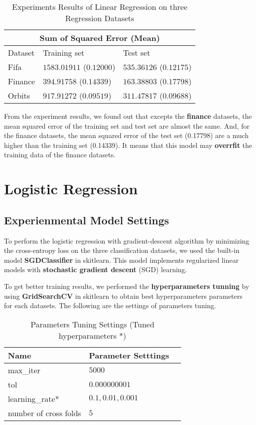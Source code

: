 \documentclass{article}
\begin{document}
\begin{table}[htb]
	\caption{Experiments Results of Linear Regression on three Regression Datasets}
	\label{sample-table}
	\centering
	\begin{tabular}{lll}
		\toprule
		\cmidrule{1-3}
		\multicolumn{3}{c}{Sum of Squared Error (Mean)}\\
		\midrule
		Dataset & Training set & Test set \\
		\midrule
		Fifa & $1583.01911$ ($0.12000$) & $535.36126$ ($0.12175$) \\
		Finance & $394.91758$ ($0.14339$) & $163.38803$ ($0.17798$) \\
		Orbits & $917.91272$ ($0.09519$) & $311.47817$ ($0.09688$)  \\
		\bottomrule
	\end{tabular}
\end{table}

From the experiment results, we found out that excepts the \textbf{finance} datasets, the mean squared error of the training set and test set are almost the same. And, for the finance datasets, the mean squared error of the test set (0.17798) are a much higher than the training set (0.14339). It means that this model may \textbf{overrfit} the training data of the finance datasets.

\section{Logistic Regression}

\subsection{Experienmental Model Settings}

To perform the logistic regression with gradient-descent algorithm by minimizing the cross-entropy loss on the three classification datasets,  we used the built-in model \textbf{SGDClassifier} in skitlearn. This model implements regularized linear models with \textbf{stochastic gradient descent} (SGD) learning. 

\pagebreak

To get better training results, we performed the \textbf{hyperparameters tunning} by using \textbf{GridSearchCV} in skitlearn to obtain best hyperparameters parameters for each datasets. The following are the settings of parameters tuning.

\begin{table}[htb]
	\caption{Parameters Tuning Settings (Tuned hyperparameters *)}
	\label{sample-table}
	\centering
	\begin{tabular}{lll}
		\toprule
		\cmidrule{1-2}
		Name     &  Parameter Setttings	\\
		\midrule
		max\_iter 		  & 	$5000$  \\
		tol      	          & 	  $0.000000001$        \\
		learning\_rate* 		  & 	$0.1, 0.01,  0.001$    \\
		number of cross folds		  &   $5$     \\
		\bottomrule
	\end{tabular}
\end{table}
\end{document}

